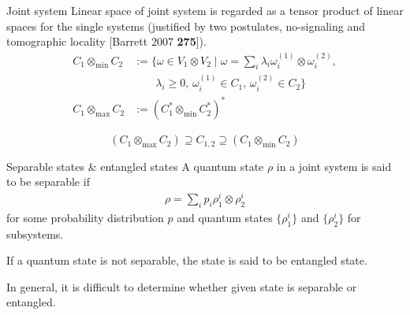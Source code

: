 \documentclass[10pt]{beamer}
\newcommand\emm[1]{\textcolor{redorange}{{#1}}}
\newcommand\numc[1]{\textcolor{citation}{{\bf #1}}}
\begin{document}
\begin{frame}{Joint system}
Linear space of joint system is regarded as a \emm{tensor product} of linear spaces for the single systems
(justified by two postulates, no-signaling and tomographic locality [Barrett 2007 \numc{275}]).
\begin{align*}
C_1 \otimes_{\min} C_2
&:=\Bigg\{\omega \in V_1\otimes V_2 \mid \omega = \sum_i \lambda_i \omega^{(1)}_i\otimes \omega^{(2)}_i,\\
&\qquad \lambda_i \ge 0,\, \omega^{(1)}_i \in C_1,\, \omega^{(2)}_i \in C_2\Bigg\}\\
C_1 \otimes_{\max} C_2
&:=(C^*_1 \otimes_{\min} C^*_2 )^*
\end{align*}

\vspace{2em}
\begin{equation*}
(C_1 \otimes_{\max} C_2)
\supseteq
C_{1,2}\supseteq
(C_1 \otimes_{\min} C_2)
\end{equation*}
\end{frame}
\fi



\begin{frame}{Separable states \& entangled states}
A quantum state $\rho$ in a joint system is said to be \emm{separable} if
\begin{align*}
\rho = \sum_{i}p_i \rho_1^i \otimes \rho_2^i
\end{align*}
for some probability distribution $p$ and quantum states $\{\rho_1^i\}$ and $\{\rho_2^i\}$ for subsystems.

\vspace{2em}
If a quantum state is not separable, the state is said to be \emm{entangled} state.

\vspace{2em}
In general, it is difficult to determine whether given state is separable or entangled.
\end{frame}
\end{document}
